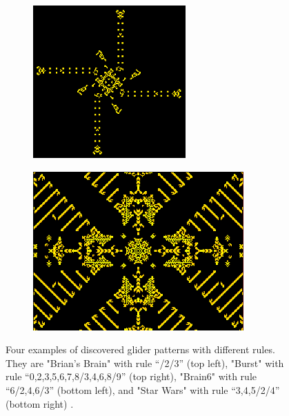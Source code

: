\documentclass[12pt]{article}
\numberwithin{figure}{section} %
\begin{document}
\begin{figure}[H]
\begin{subfigure}{0.42\textwidth}
     \includegraphics[width=\linewidth]{Section1/8.3}
     \subcaption{}
   \end{subfigure}
     \begin{subfigure}{0.56\textwidth}
     \centering
     \includegraphics[width=\linewidth]{Section1/8.4}
     \subcaption{}
   \end{subfigure}
   \caption[Examples of famous gliders]{Four examples of discovered glider patterns with different rules. They are "Brian’s Brain" with rule “/2/3” (top left), "Burst" with rule “0,2,3,5,6,7,8/3,4,6,8/9” (top right), "Brain6" with rule “6/2,4,6/3” (bottom left), and "Star Wars" with rule “3,4,5/2/4” (bottom right) \cite{Lexicon}.}
   \label{fig:famous gliders}
   \vspace{-1.5em}
\end{figure}
\end{document}
